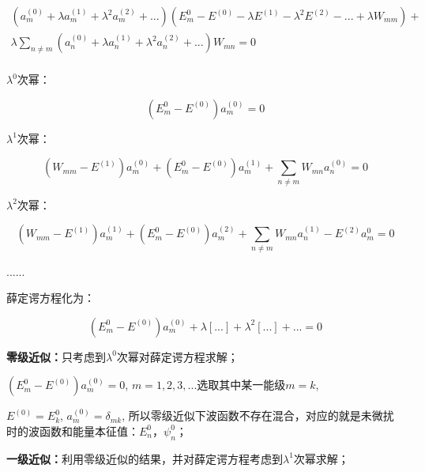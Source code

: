 \begin{equation}\label{22-7}
\begin{array}{l}
 \left( {a_m^{(0)}  + \lambda a_m^{(1)}  + \lambda ^2 a_m^{(2)}  + ...} \right)\left( {E_m^0  - E^{(0)}  - \lambda E^{(1)}  - \lambda ^2 E^{(2)}  - ... + \lambda W_{mm} } \right) +  \\
 \lambda \sum\limits_{n \ne m} {\left( {a_n^{(0)}  + \lambda a_n^{(1)}  + \lambda ^2 a_n^{(2)}  + ...} \right)W_{mn} }  = 0 \\
 \end{array}
\end{equation}

$\lambda ^0$次幂：

\begin{equation*}
\left( {E_m^0  - E^{(0)} } \right)a_m^{(0)}  = 0
\end{equation*}

$\lambda ^1$次幂：

\begin{equation*}
 {\left( {W_{mm}  - E^{(1)} } \right)a_m^{(0)}  + \left( {E_m^0  - E^{(0)} } \right)a_m^{(1)}  + \sum\limits_{n \ne m} {W_{mn} a_n^{(0)} } }  = 0
\end{equation*}

$\lambda ^2$次幂：

\begin{equation*}
{\left( {W_{mm}  - E^{(1)} } \right)a_m^{(1)}  + \left( {E_m^0  - E^{(0)} } \right)a_m^{(2)}  + \sum\limits_{n \ne m} {W_{mn} a_n^{(1)}  - E^{(2)} a_m^0 } }  = 0 
\end{equation*}

......

薛定谔方程化为：

\begin{equation}\label{22-8}
\left( {E_m^0  - E^{(0)} } \right)a_m^{(0)}  + \lambda \left[ ... \right]  + \lambda ^2 \left[ ...  \right] + ... = 0 
\end{equation}

\textbf{零级近似：}只考虑到$\lambda ^0 $次幂对薛定谔方程求解；

$\left( {E_m^0  - E^{(0)} } \right)a_m^{(0)}  = 0$, $m = 1,2,3,...$选取其中某一能级$m = k$,

$E^{(0)}  = E_k^0 $, $a_m^{(0)}  = \delta _{mk} $, 所以零级近似下波函数不存在混合，对应的就是未微扰时的波函数和能量本征值：$E_n^0 $，$\psi _n^0 $；

\textbf{一级近似：}利用零级近似的结果，并对薛定谔方程考虑到$\lambda ^1 $次幂求解；


